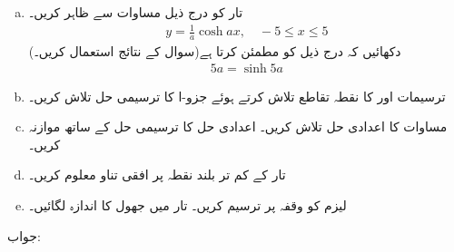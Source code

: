 \begin{enumerate}[a.]
\item
تار کو درج ذیل مساوات سے ظاہر کریں۔
\begin{align*}
y=\frac{1}{a}\cosh ax,\quad -5\le x\le 5
\end{align*}
دکھائیں کہ  درج ذیل کو مطمئن کرتا ہے(سوال  کے نتائج استعمال کریں۔)
\begin{align}\label{مساوات_ماورائی_لیزم}
5a=\sinh 5a
\end{align}
\item
 ترسیمات  اور   کا نقطہ تقاطع تلاش کرتے ہوئے جزو-ا کا ترسیمی حل تلاش کریں۔
\item
مساوات  کا اعدادی حل تلاش کریں۔ اعدادی حل کا ترسیمی حل کے ساتھ موازنہ کریں۔
\item
تار کے کم تر بلند نقطہ پر افقی تناو معلوم کریں۔
\item
لیزم  کو وقفہ  پر ترسیم کریں۔ تار میں جھول کا اندازہ لگائیں۔
\end{enumerate}
جواب: 
